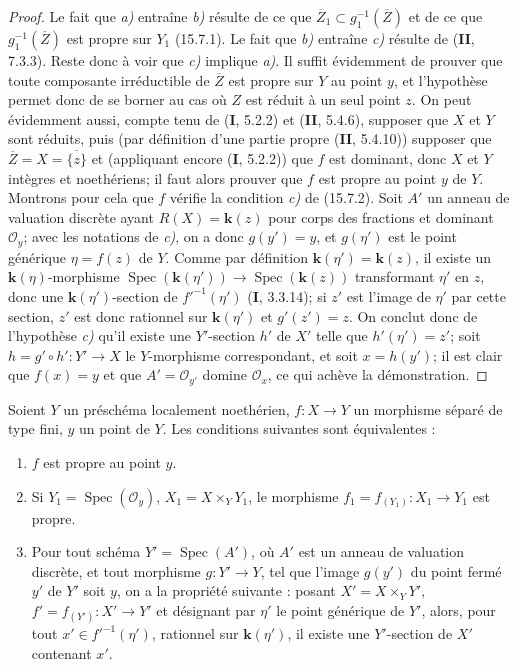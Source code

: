 \begin{proof}
Le fait que \emph{a)} entraîne \emph{b)} résulte de ce que $\overline Z_1\subset g_1^{-1}(\overline Z)$ et de ce que $g_1^{-1}(\overline Z)$ est propre sur $Y_1$ (15.7.1). Le fait que \emph{b)} entraîne \emph{c)} résulte de (\textbf{II}, 7.3.3). Reste donc à voir que \emph{c)} implique \emph{a)}. Il suffit évidemment de prouver que toute composante irréductible de $\overline Z$ est propre sur $Y$ au point $y$, et l'hypothèse permet donc de se borner au cas où $Z$ est réduit à un seul point $z$. On peut évidemment aussi, compte tenu de (\textbf{I}, 5.2.2) et (\textbf{II}, 5.4.6), supposer que $X$ et $Y$ sont réduits, puis (par définition d'une partie propre (\textbf{II}, 5.4.10)) supposer que $\overline Z=X=\overline{\{z\}}$ et (appliquant encore (\textbf{I}, 5.2.2)) que $f$ est dominant, donc $X$ et $Y$ intègres et noethériens; il faut alors prouver que $f$ est propre au point $y$ de $Y$. Montrons pour cela que $f$ vérifie la condition \emph{c)} de (15.7.2). Soit $A'$ un anneau de valuation discrète ayant $R(X)=\boldsymbol{k}(z)$ pour corps des fractions et dominant $\mathcal O_y$; avec les notations de \emph{c)}, on a donc $g(y')=y$, et $g(\eta')$ est le point générique $\eta=f(z)$ de $Y$. Comme par définition $\boldsymbol{k}(\eta')=\boldsymbol{k}(z)$, il existe un $\boldsymbol{k}(\eta)$-morphisme $\operatorname{Spec}(\boldsymbol{k}(\eta'))\to\operatorname{Spec}(\boldsymbol{k}(z))$ transformant $\eta'$ en $z$, donc une $\boldsymbol{k}(\eta')$-section de $f'^{-1}(\eta')$ (\textbf{I}, 3.3.14); si $z'$ est l'image de $\eta'$ par cette section, $z'$ est donc rationnel sur $\boldsymbol{k}(\eta')$ et $g'(z')=z$. On conclut donc de l'hypothèse \emph{c)} qu'il existe une $Y'$-section $h'$ de $X'$ telle que $h'(\eta')=z'$; soit $h=g'\circ h':Y'\to X$ le $Y$-morphisme correspondant, et soit $x=h(y')$; il est clair que $f(x)=y$ et que $A'=\mathcal O_{y'}$ domine $\mathcal O_x$, ce qui achève la démonstration.
\end{proof}

\begin{corollary}[15.7.5]
\label{IV.15.7.5-fr}
Soient $Y$ un préschéma localement noethérien, $f:X\to Y$ un morphisme séparé de type fini, $y$ un point de $Y$. Les conditions suivantes sont équivalentes :
\begin{enumerate}
  \item[\rm a)] $f$ est propre au point $y$.
  \item[\rm b)] Si $Y_1=\operatorname{Spec}(\mathcal O_y)$, $X_1=X\times_Y Y_1$, le morphisme $f_1=f_{(Y_1)}:X_1\to Y_1$ est propre.
  \item[\rm c)] Pour tout schéma $Y'=\operatorname{Spec}(A')$, où $A'$ est un anneau de valuation discrète, et tout morphisme $g:Y'\to Y$, tel que l'image $g(y')$ du point fermé $y'$ de $Y'$ soit $y$, on a la propriété suivante : posant $X'=X\times_Y Y'$, $f'=f_{(Y')}:X'\to Y'$ et désignant par $\eta'$ le point générique de $Y'$, alors, pour tout $x'\in f'^{-1}(\eta')$, rationnel sur $\boldsymbol{k}(\eta')$, il existe une $Y'$-section de $X'$ contenant $x'$.
\end{enumerate}
\end{corollary}

